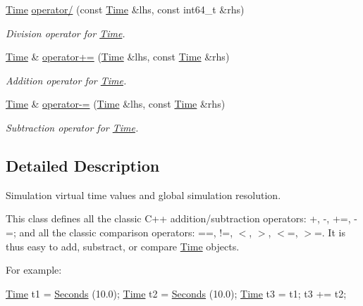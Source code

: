 \begin{DoxyCompactItemize}
\hyperlink{classns3_1_1Time}{Time} \hyperlink{classns3_1_1Time_a9df24384000a6b9129c033103e5d7777}{operator/} (const \hyperlink{classns3_1_1Time}{Time} \&lhs, const int64\+\_\+t \&rhs)
\begin{DoxyCompactList}\small\item\em Division operator for \hyperlink{classns3_1_1Time}{Time}. \end{DoxyCompactList}\item 
\hyperlink{classns3_1_1Time}{Time} \& \hyperlink{classns3_1_1Time_a8f7b960483357b209ad8f2345b61ed27}{operator+=} (\hyperlink{classns3_1_1Time}{Time} \&lhs, const \hyperlink{classns3_1_1Time}{Time} \&rhs)
\begin{DoxyCompactList}\small\item\em Addition operator for \hyperlink{classns3_1_1Time}{Time}. \end{DoxyCompactList}\item 
\hyperlink{classns3_1_1Time}{Time} \& \hyperlink{classns3_1_1Time_af13e8e4df12437961739305968b5cb83}{operator-\/=} (\hyperlink{classns3_1_1Time}{Time} \&lhs, const \hyperlink{classns3_1_1Time}{Time} \&rhs)
\begin{DoxyCompactList}\small\item\em Subtraction operator for \hyperlink{classns3_1_1Time}{Time}. \end{DoxyCompactList}\end{DoxyCompactItemize}



\subsection{Detailed Description}
Simulation virtual time values and global simulation resolution. 

This class defines all the classic C++ addition/subtraction operators\+: +, -\/, +=, -\/=; and all the classic comparison operators\+: ==, !=, $<$, $>$, $<$=, $>$=. It is thus easy to add, substract, or compare \hyperlink{classns3_1_1Time}{Time} objects.

For example\+: 
\begin{DoxyCode}
\hyperlink{classns3_1_1Time_a8a39dc1b8cbbd7fe6d940e492d1b925e}{Time} t1 = \hyperlink{group__timecivil_ga33c34b816f8ff6628e33d5c8e9713b9e}{Seconds} (10.0);
\hyperlink{classns3_1_1Time_a8a39dc1b8cbbd7fe6d940e492d1b925e}{Time} t2 = \hyperlink{group__timecivil_ga33c34b816f8ff6628e33d5c8e9713b9e}{Seconds} (10.0);
\hyperlink{classns3_1_1Time_a8a39dc1b8cbbd7fe6d940e492d1b925e}{Time} t3 = t1;
t3 += t2;
\end{DoxyCode}



